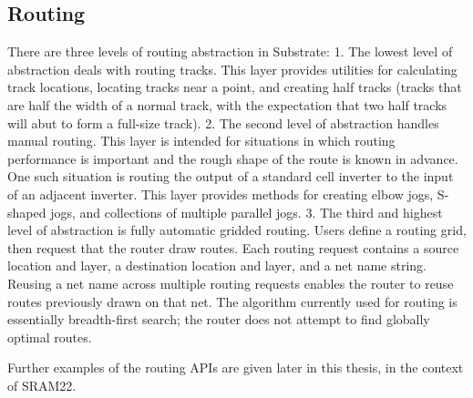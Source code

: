 \subsection{Routing} \label{sec:routing}

There are three levels of routing abstraction in Substrate:
1. The lowest level of abstraction deals with routing tracks. This layer provides utilities for calculating
   track locations, locating tracks near a point, and creating half tracks
   (tracks that are half the width of a normal track, with the expectation that two half tracks will abut
   to form a full-size track).
2. The second level of abstraction handles manual routing. This layer is intended for situations in which
   routing performance is important and the rough shape of the route is known in advance. One such situation is
   routing the output of a standard cell inverter to the input of an adjacent inverter. This layer
   provides methods for creating elbow jogs, S-shaped jogs, and collections of multiple parallel jogs.
3. The third and highest level of abstraction is fully automatic gridded routing. Users define a routing grid,
   then request that the router draw routes. Each routing request contains a source location and layer,
   a destination location and layer, and a net name string. Reusing a net name across multiple routing requests
   enables the router to reuse routes previously drawn on that net. The algorithm currently used for routing
   is essentially breadth-first search; the router does not attempt to find globally optimal routes.

Further examples of the routing APIs are given later in this thesis, in the context of SRAM22.

